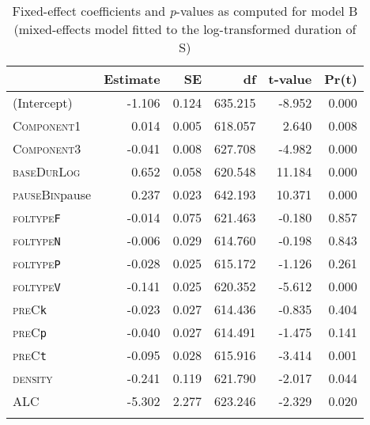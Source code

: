 \begin{table}[H]\fontsize{10}{11}
\caption{Fixed-effect coefficients and \textit{p}-values as computed for model B (mixed-effects model fitted to the log-transformed duration of S)}
\label{tab:5.9}
\centering
\begin{tabular}{lrrrrr} 
\lsptoprule
~             & Estimate & SE    & df      & t-value & Pr(\textbar{}t\textbar{})  \\ 
\midrule
(Intercept)   & -1.106   & 0.124 & 635.215 & -8.952  & 0.000                      \\
\textsc{Component1}    & 0.014    & 0.005 & 618.057 & 2.640   & 0.008                      \\
\textsc{Component3}    & -0.041   & 0.008 & 627.708 & -4.982  & 0.000                      \\
\textsc{baseDurLog}    & 0.652    & 0.058 & 620.548 & 11.184  & 0.000                      \\
\textsc{pauseBin}pause & 0.237    & 0.023 & 642.193 & 10.371  & 0.000                      \\
\textsc{foltype}\texttt{F}      & -0.014   & 0.075 & 621.463 & -0.180  & 0.857                      \\
\textsc{foltype}\texttt{N}      & -0.006   & 0.029 & 614.760 & -0.198  & 0.843                      \\
\textsc{foltype}\texttt{P}      & -0.028   & 0.025 & 615.172 & -1.126  & 0.261                      \\
\textsc{foltype}\texttt{V}      & -0.141   & 0.025 & 620.352 & -5.612  & 0.000                      \\
\textsc{preC}\texttt{k}         & -0.023   & 0.027 & 614.436 & -0.835  & 0.404                      \\
\textsc{preC}\texttt{p}         & -0.040   & 0.027 & 614.491 & -1.475  & 0.141                      \\
\textsc{preC}\texttt{t}         & -0.095   & 0.028 & 615.916 & -3.414  & 0.001                      \\
\textsc{density}       & -0.241   & 0.119 & 621.790 & -2.017  & 0.044                      \\
\textsc{ALC}           & -5.302   & 2.277 & 623.246 & -2.329  & 0.020                      \\
\lspbottomrule
\end{tabular}
\end{table}




